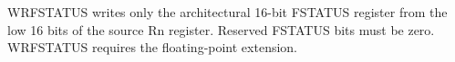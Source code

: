 WRFSTATUS writes only the architectural 16-bit FSTATUS register from the low 16 bits of the source Rn register. Reserved FSTATUS bits must be zero. WRFSTATUS requires the floating-point extension.
